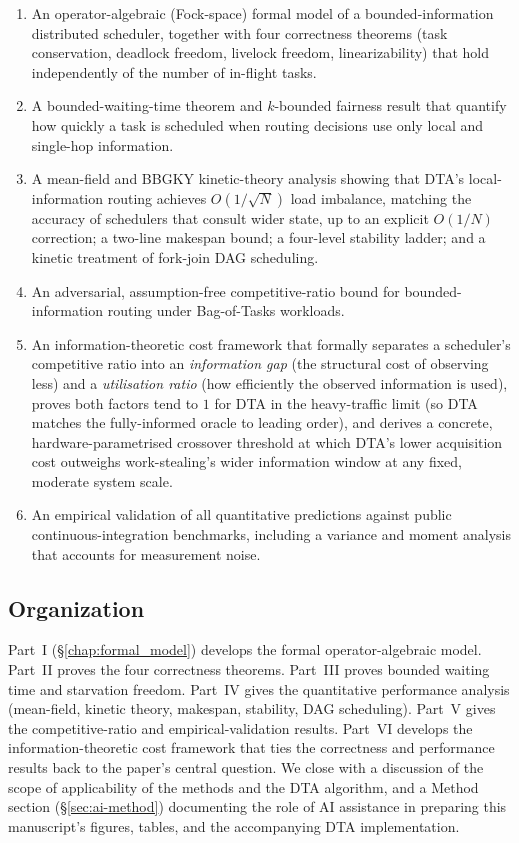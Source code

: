 \documentclass[11pt,a4paper]{article}
\newcommand{\dtact}{\textsc{DTA}}
\begin{document}
\begin{enumerate}
  \item An operator-algebraic (Fock-space) formal model of a
        bounded-information distributed scheduler, together with four
        correctness theorems (task conservation, deadlock freedom,
        livelock freedom, linearizability) that hold independently of the
        number of in-flight tasks.
  \item A bounded-waiting-time theorem and $k$-bounded fairness result
        that quantify how quickly a task is scheduled when routing
        decisions use only local and single-hop information.
  \item A mean-field and BBGKY kinetic-theory analysis showing that
        DTA's local-information routing achieves $O(1/\sqrt{N})$ load
        imbalance, matching the accuracy of schedulers that consult wider
        state, up to an explicit $O(1/N)$ correction; a two-line makespan
        bound; a four-level stability ladder; and a kinetic treatment of
        fork-join DAG scheduling.
  \item An adversarial, assumption-free competitive-ratio bound for
        bounded-information routing under Bag-of-Tasks workloads.
  \item An information-theoretic cost framework that formally separates a
        scheduler's competitive ratio into an \emph{information gap}
        (the structural cost of observing less) and a \emph{utilisation
        ratio} (how efficiently the observed information is used), proves
        both factors tend to $1$ for DTA in the heavy-traffic limit (so
        DTA matches the fully-informed oracle to leading order), and
        derives a concrete, hardware-parametrised crossover threshold at
        which DTA's lower acquisition cost outweighs work-stealing's
        wider information window at any fixed, moderate system scale.
  \item An empirical validation of all quantitative predictions against
        public continuous-integration benchmarks, including a variance
        and moment analysis that accounts for measurement noise.
\end{enumerate}

\subsection*{Organization}
\label{sec:organization}

Part~I (\S\ref{chap:formal_model}) develops the formal operator-algebraic
model. Part~II proves the four correctness theorems. Part~III proves
bounded waiting time and starvation freedom. Part~IV gives the
quantitative performance analysis (mean-field, kinetic theory, makespan,
stability, DAG scheduling). Part~V gives the competitive-ratio and
empirical-validation results. Part~VI develops the information-theoretic
cost framework that ties the correctness and performance results back to
the paper's central question. We close with a discussion of the scope of
applicability of the methods and the DTA algorithm, and a Method section
(\S\ref{sec:ai-method}) documenting the role of AI assistance in
preparing this manuscript's figures, tables, and the accompanying
\dtact{} implementation.
\end{document}
